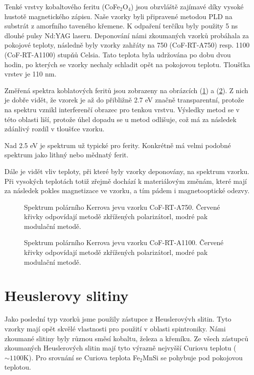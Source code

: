 Tenké vrstvy kobaltového feritu (CoFe$_2$O$_4$) jsou obzvláště zajímavé díky vysoké hustotě magnetického zápisu.
Naše vzorky byli připravené metodou PLD na substrát z amorfního taveného křemene. K odpaření terčíku byly použity 5 ns dlouhé pulsy Nd:YAG laseru. 
Deponování námi zkoumaných vzorků probáhala za pokojové teploty, následně byly vzorky zahřáty na 750 (CoF-RT-A750) resp. 1100 (CoF-RT-A1100) 
stupňů Celsia. Tato teplota byla udržována po dobu dvou hodin, po kterých se vzorky nechaly schladit opět na pokojovou teplotu. Tloušťka vrstev je 110 nm.

Změřená spektra koblatových feritů jsou zobrazeny na obrázcích (\ref{sCoF-RT-A750}) a (\ref{sCoF-RT-A1100}). Z nich je dobře vidět, že vzorek je až do přibližně 2.7 eV značně transparentní, protože na spektru vznikl interferenčí obrazec pro tenkou vrstvu. Výsledky metod se v této oblasti liší, protože úhel dopadu se u metod odlišuje, což má za následek zdánlivý rozdíl 
v tloušťce vzorku. 

Nad 2.5 eV je spektrum už typické pro ferity. Konkrétně má velmi podobné spektrum jako lithný nebo mědnatý ferit. %

Dále je vidět vliv teploty, při které byly vzorky deponovány, na spektrum vzorku. Při vysokých teplotách totiž zřejmě dochází k materiálovým změnám, které mají za následek pokles magnetizace ve vzorku, a tím pádem i magnetooptické odezvy.


\begin{figure}

\caption{Spektrum polárního Kerrova jevu vzorku CoF-RT-A750. Červené křivky odpovídají metodě zkřížených polarizátorl, modré pak modulační metodě.}
\label{sCoF-RT-A750}
\end{figure}

\begin{figure}

\caption{Spektrum polárního Kerrova jevu vzorku CoF-RT-A1100. Červené křivky odpovídají metodě zkřížených polarizátorl, modré pak modulační metodě.}
\label{sCoF-RT-A1100}
\end{figure}

\section{Heuslerovy slitiny}
Jako poslední typ vzorků jsme použily zástupce z Heuslerovývh slitin. Tyto vzorky mají opět 
skvělé vlastnosti pro použití v oblasti spintroniky.  Námi zkoumané slitiny byly různou směsí kobaltu, 
železa a křemíku. Ze všech zástupců zkoumaných Heuslerových slitin mají tyto výrazně nejvyšší Curiovu 
teplotu ($\sim 1100$K). Pro srovnání se Curiova teplota Fe$_2$MnSi se pohybuje pod pokojovou teplotou.

